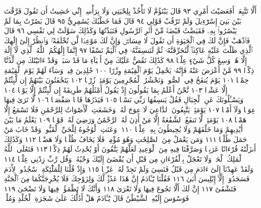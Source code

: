 أَلَّا تَتَّبِعَنِۖ أَفَعَصَيْتَ أَمْرِي ٩٣ قَالَ يَبْنَؤُمَّ لَا تَأْخُذْ بِلِحْيَتِي
وَلَا بِرَأْسِيٓۖ إِنِّي خَشِيتُ أَن تَقُولَ فَرَّقْتَ بَيْنَ بَنِيٓ إِسْرَٰٓءِيلَ
وَلَمْ تَرْقُبْ قَوْلِي ٩٤ قَالَ فَمَا خَطْبُكَ يَٰسَٰمِرِيُّ ٩٥ قَالَ
بَصُرْتُ بِمَا لَمْ يَبْصُرُوا۟ بِهِۦ فَقَبَضْتُ قَبْضَةࣰ مِّنْ أَثَرِ
ٱلرَّسُولِ فَنَبَذْتُهَا وَكَذَٰلِكَ سَوَّلَتْ لِي نَفْسِي ٩٦ قَالَ
فَٱذْهَبْ فَإِنَّ لَكَ فِي ٱلْحَيَوٰةِ أَن تَقُولَ لَا مِسَاسَۖ وَإِنَّ لَكَ
مَوْعِدࣰا لَّن تُخْلَفَهُۥۖ وَٱنظُرْ إِلَىٰٓ إِلَٰهِكَ ٱلَّذِي ظَلْتَ عَلَيْهِ
عَاكِفࣰاۖ لَّنُحَرِّقَنَّهُۥ ثُمَّ لَنَنسِفَنَّهُۥ فِي ٱلْيَمِّ نَسْفًا ٩٧ إِنَّمَآ
إِلَٰهُكُمُ ٱللَّهُ ٱلَّذِي لَآ إِلَٰهَ إِلَّا هُوَۚ وَسِعَ كُلَّ شَيْءٍ عِلْمࣰا ٩٨
كَذَٰلِكَ نَقُصُّ عَلَيْكَ مِنْ أَنۢبَآءِ مَا قَدْ سَبَقَۚ وَقَدْ ءَاتَيْنَٰكَ مِن لَّدُنَّا
ذِكْرࣰا ٩٩ مَّنْ أَعْرَضَ عَنْهُ فَإِنَّهُۥ يَحْمِلُ يَوْمَ ٱلْقِيَٰمَةِ وِزْرًا ١٠٠
خَٰلِدِينَ فِيهِۖ وَسَآءَ لَهُمْ يَوْمَ ٱلْقِيَٰمَةِ حِمْلࣰا ١٠١ يَوْمَ يُنفَخُ
فِي ٱلصُّورِۚ وَنَحْشُرُ ٱلْمُجْرِمِينَ يَوْمَئِذࣲ زُرْقࣰا ١٠٢ يَتَخَٰفَتُونَ
بَيْنَهُمْ إِن لَّبِثْتُمْ إِلَّا عَشْرࣰا ١٠٣ نَّحْنُ أَعْلَمُ بِمَا يَقُولُونَ إِذْ يَقُولُ
أَمْثَلُهُمْ طَرِيقَةً إِن لَّبِثْتُمْ إِلَّا يَوْمࣰا ١٠٤ وَيَسْـَٔلُونَكَ عَنِ ٱلْجِبَالِ
فَقُلْ يَنسِفُهَا رَبِّي نَسْفࣰا ١٠٥ فَيَذَرُهَا قَاعࣰا صَفْصَفࣰا ١٠٦
لَّا تَرَىٰ فِيهَا عِوَجࣰا وَلَآ أَمْتࣰا ١٠٧ يَوْمَئِذࣲ يَتَّبِعُونَ ٱلدَّاعِيَ لَا عِوَجَ
لَهُۥۖ وَخَشَعَتِ ٱلْأَصْوَاتُ لِلرَّحْمَٰنِ فَلَا تَسْمَعُ إِلَّا هَمْسࣰا ١٠٨
يَوْمَئِذࣲ لَّا تَنفَعُ ٱلشَّفَٰعَةُ إِلَّا مَنْ أَذِنَ لَهُ ٱلرَّحْمَٰنُ وَرَضِيَ لَهُۥ
قَوْلࣰا ١٠٩ يَعْلَمُ مَا بَيْنَ أَيْدِيهِمْ وَمَا خَلْفَهُمْ وَلَا يُحِيطُونَ بِهِۦ
عِلْمࣰا ١١٠۞ وَعَنَتِ ٱلْوُجُوهُ لِلْحَيِّ ٱلْقَيُّومِۖ وَقَدْ خَابَ مَنْ حَمَلَ
ظُلْمࣰا ١١١ وَمَن يَعْمَلْ مِنَ ٱلصَّٰلِحَٰتِ وَهُوَ مُؤْمِنࣱ فَلَا يَخَافُ
ظُلْمࣰا وَلَا هَضْمࣰا ١١٢ وَكَذَٰلِكَ أَنزَلْنَٰهُ قُرْءَانًا عَرَبِيࣰّا وَصَرَّفْنَا
فِيهِ مِنَ ٱلْوَعِيدِ لَعَلَّهُمْ يَتَّقُونَ أَوْ يُحْدِثُ لَهُمْ ذِكْرࣰا ١١٣
فَتَعَٰلَى ٱللَّهُ ٱلْمَلِكُ ٱلْحَقُّۗ وَلَا تَعْجَلْ بِٱلْقُرْءَانِ مِن قَبْلِ أَن
يُقْضَىٰٓ إِلَيْكَ وَحْيُهُۥۖ وَقُل رَّبِّ زِدْنِي عِلْمࣰا ١١٤ وَلَقَدْ عَهِدْنَآ
إِلَىٰٓ ءَادَمَ مِن قَبْلُ فَنَسِيَ وَلَمْ نَجِدْ لَهُۥ عَزْمࣰا ١١٥ وَإِذْ قُلْنَا
لِلْمَلَٰٓئِكَةِ ٱسْجُدُوا۟ لِأٓدَمَ فَسَجَدُوٓا۟ إِلَّآ إِبْلِيسَ أَبَىٰ ١١٦
فَقُلْنَا يَٰٓـَٔادَمُ إِنَّ هَٰذَا عَدُوࣱّ لَّكَ وَلِزَوْجِكَ فَلَا يُخْرِجَنَّكُمَا
مِنَ ٱلْجَنَّةِ فَتَشْقَىٰٓ ١١٧ إِنَّ لَكَ أَلَّا تَجُوعَ فِيهَا وَلَا تَعْرَىٰ ١١٨
وَأَنَّكَ لَا تَظْمَؤُا۟ فِيهَا وَلَا تَضْحَىٰ ١١٩ فَوَسْوَسَ إِلَيْهِ
ٱلشَّيْطَٰنُ قَالَ يَٰٓـَٔادَمُ هَلْ أَدُلُّكَ عَلَىٰ شَجَرَةِ ٱلْخُلْدِ وَمُلْكࣲ
